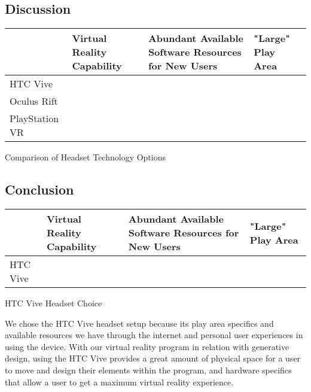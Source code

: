 \documentclass[letterpaper,10pt,onecolumn,compsoc]{IEEEtran}
\begin{document}
\newpage

\subsection{Discussion}

\begin{center}
\begin{tabular}{ | P{2.5cm} | P{3cm} | P{4.5cm} | P{1.75cm} |} 
 	\hline
 	 & Virtual Reality Capability & Abundant Available Software Resources for New Users & "Large" Play Area \\ 
 	\hline 		
 	HTC Vive & \checkmark & \checkmark & \checkmark \\ 
 	\hline
 	Oculus Rift & \checkmark & & \checkmark \\ 
 	\hline
 	PlayStation VR & \checkmark & & \\ 
 	\hline
\end{tabular}
\end{center}

\begin{center}
Comparison of Headset Technology Options
\end{center}

\subsection{Conclusion}

\begin{center}
\begin{tabular}{ | P{2.5cm} | P{3cm} | P{4.5cm} | P{1.75cm} |} 
 	\hline
 	 & Virtual Reality Capability & Abundant Available Software Resources for New Users & "Large" Play Area \\ 
 	\hline 		
 	HTC Vive & \checkmark & \checkmark & \checkmark \\ 
 	\hline
\end{tabular}
\end{center}

\begin{center}
HTC Vive Headset Choice
\end{center}

\noindent
We chose the HTC Vive headset setup because its play area specifics and available resources we have through the internet and personal user experiences in using the device. With our virtual reality program in relation with generative design, using the HTC Vive provides a great amount of physical space for a user to move and design their elements within the program, and hardware specifics that allow a user to get a maximum virtual reality experience.
\end{document}
